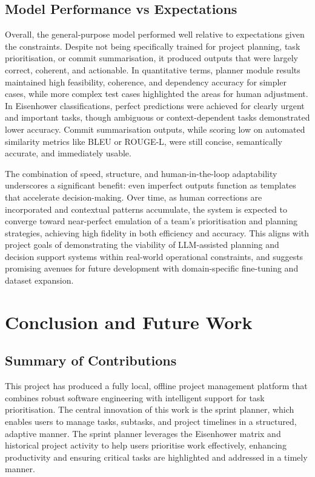 \documentclass{report}
\begin{document}
\section{Model Performance vs Expectations}

Overall, the general-purpose model performed well relative to expectations given the constraints. Despite not being specifically trained for project planning, task prioritisation, or commit summarisation, it produced outputs that were largely correct, coherent, and actionable. In quantitative terms, planner module results maintained high feasibility, coherence, and dependency accuracy for simpler cases, while more complex test cases highlighted the areas for human adjustment. In Eisenhower classifications, perfect predictions were achieved for clearly urgent and important tasks, though ambiguous or context-dependent tasks demonstrated lower accuracy. Commit summarisation outputs, while scoring low on automated similarity metrics like BLEU or ROUGE-L, were still concise, semantically accurate, and immediately usable.

The combination of speed, structure, and human-in-the-loop adaptability underscores a significant benefit: even imperfect outputs function as templates that accelerate decision-making. Over time, as human corrections are incorporated and contextual patterns accumulate, the system is expected to converge toward near-perfect emulation of a team's prioritisation and planning strategies, achieving high fidelity in both efficiency and accuracy. This aligns with project goals of demonstrating the viability of LLM-assisted planning and decision support systems within real-world operational constraints, and suggests promising avenues for future development with domain-specific fine-tuning and dataset expansion.

\chapter{Conclusion and Future Work}  %
\section{Summary of Contributions}
This project has produced a fully local, offline project management platform that combines robust software engineering with intelligent support for task prioritisation. The central innovation of this work is the sprint planner, which enables users to manage tasks, subtasks, and project timelines in a structured, adaptive manner. The sprint planner leverages the Eisenhower matrix and historical project activity to help users prioritise work effectively, enhancing productivity and ensuring critical tasks are highlighted and addressed in a timely manner.
\end{document}
